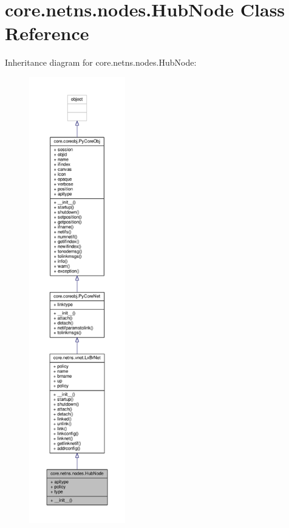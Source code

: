 \hypertarget{classcore_1_1netns_1_1nodes_1_1_hub_node}{\section{core.\+netns.\+nodes.\+Hub\+Node Class Reference}
\label{classcore_1_1netns_1_1nodes_1_1_hub_node}
}


Inheritance diagram for core.\+netns.\+nodes.\+Hub\+Node\+:
\nopagebreak
\begin{figure}[H]
\begin{center}
\leavevmode
\includegraphics[height=550pt]{classcore_1_1netns_1_1nodes_1_1_hub_node__inherit__graph}
\end{center}
\end{figure}


